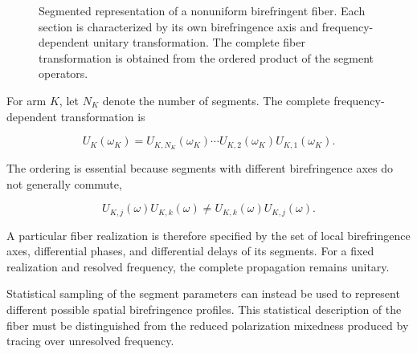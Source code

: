 \begin{figure}[htbp]

    \caption{
        Segmented representation of a nonuniform birefringent fiber. Each
        section is characterized by its own birefringence axis and
        frequency-dependent unitary transformation. The complete fiber
        transformation is obtained from the ordered product of the segment
        operators.
    }
    \label{fig:segmented_fiber_model}
\end{figure}

For arm \(K\), let \(N_K\) denote the number of segments. The complete
frequency-dependent transformation is

\begin{equation}
\boxed{
U_K(\omega_K)
=
U_{K,N_K}(\omega_K)
\cdots
U_{K,2}(\omega_K)
U_{K,1}(\omega_K).
}
\label{eq:concatenated_fiber_operator}
\end{equation}

The ordering is essential because segments with different birefringence axes do
not generally commute,

\begin{equation}
U_{K,j}(\omega)
U_{K,k}(\omega)
\neq
U_{K,k}(\omega)
U_{K,j}(\omega).
\label{eq:noncommuting_birefringent_segments}
\end{equation}

A particular fiber realization is therefore specified by the set of local
birefringence axes, differential phases, and differential delays of its segments.
For a fixed realization and resolved frequency, the complete propagation remains
unitary.

Statistical sampling of the segment parameters can instead be used to represent
different possible spatial birefringence profiles. This statistical description
of the fiber must be distinguished from the reduced polarization mixedness
produced by tracing over unresolved frequency.

